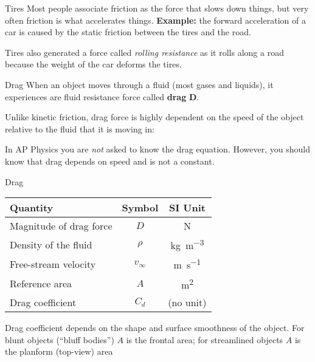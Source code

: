 \documentclass[12pt,compress,aspectratio=169]{beamer}
\begin{document}
\begin{frame}{Tires}
  Most people associate friction as the force that slows down things, but very
  often friction is what accelerates things. \textbf{Example:} the forward
  acceleration of a car is caused by the static friction between the tires and
  the road.
  \begin{center}
  \end{center}
  Tires also generated a force called \emph{rolling resistance} as it rolls
  along a road because the weight of the car deforms the tires.
\end{frame}




\begin{frame}{Drag}
  When an object moves through a fluid (most gases and liquids), it experiences
  are fluid resistance force called \textbf{drag} $\bm D$.
  \begin{center}
  \end{center}
  Unlike kinetic friction, drag force is highly dependent on the speed of the
  object relative to the fluid that it is moving in:
  

  \vspace{-.1in}In AP Physics you are \emph{not} asked to know the drag
  equation. However, you should know that drag depends on speed and is not a
  constant.
\end{frame}



\begin{frame}{Drag}
  \begin{center}
    \begin{tabular}{l|c|c}
      \rowcolor{pink}
      \textbf{Quantity} & \textbf{Symbol} & \textbf{SI Unit} \\ \hline
      Magnitude of drag force & $D$       & \si\newton \\
      Density of the fluid    & $\rho$    & \si{\kilo\gram\per\metre\cubed}\\
      Free-stream velocity    & $v_\infty$ & \si{\metre\per\second}\\
      Reference area          & $A$       & \si{\metre\squared}\\
      Drag coefficient        & $C_d$     & (no unit)
    \end{tabular}
  \end{center}
  Drag coefficient depends on the shape and surface smoothness of the object.
  For blunt objects (``bluff bodies'') $A$ is the frontal area; for
  streamlined objects $A$ is the planform (top-view) area
\end{frame}
\end{document}
